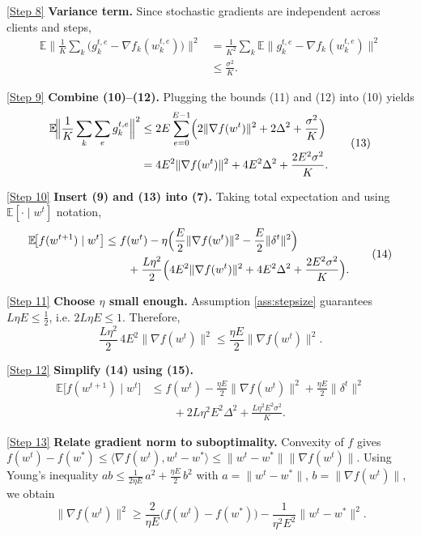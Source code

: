 \documentclass{article}
\newcommand{\E}{\mathbb{E}}
\begin{document}
\medskip
\noindent\underline{[Step 8]} \textbf{Variance term.}  
Since stochastic gradients are independent across clients and steps,
\[
\begin{aligned}
\E\!\Big\|\frac1K\sum_{k}\bigl(g_{k}^{t,e}-\nabla f_k(w_{k}^{t,e})\bigr)\Big\|^{2}
&= \frac1{K^{2}}\sum_{k}\E\!\Big\|g_{k}^{t,e}-\nabla f_k(w_{k}^{t,e})\Big\|^{2}\\
&\le \frac{\sigma^{2}}{K}.
\end{aligned} \tag{12}
\]

\medskip
\noindent\underline{[Step 9]} \textbf{Combine (10)–(12).}  
Plugging the bounds (11) and (12) into (10) yields
\[
\begin{aligned}
\E\!\Big\|\frac1K\sum_{k}\sum_{e} g_{k}^{t,e}\Big\|^{2}
&\le 2E\sum_{e=0}^{E-1}\Bigl(2\|\nabla f(w^{t})\|^{2}+2\Delta^{2}+\frac{\sigma^{2}}{K}\Bigr)\\
&= 4E^{2}\|\nabla f(w^{t})\|^{2}+4E^{2}\Delta^{2}+ \frac{2E^{2}\sigma^{2}}{K}.
\end{aligned} \tag{13}
\]

\medskip
\noindent\underline{[Step 10]} \textbf{Insert (9) and (13) into (7).}  
Taking total expectation and using $\E[\cdot\mid w^{t}]$ notation,
\[
\begin{aligned}
\E\!\bigl[f(w^{t+1})\mid w^{t}\bigr]
&\le f(w^{t})-\eta\Bigl(\frac{E}{2}\|\nabla f(w^{t})\|^{2}-\frac{E}{2}\|\delta^{t}\|^{2}\Bigr)\\
&\qquad+\frac{L\eta^{2}}{2}\Bigl(4E^{2}\|\nabla f(w^{t})\|^{2}+4E^{2}\Delta^{2}+ \frac{2E^{2}\sigma^{2}}{K}\Bigr).
\end{aligned} \tag{14}
\]

\medskip
\noindent\underline{[Step 11]} \textbf{Choose $\eta$ small enough.}  
Assumption \ref{ass:stepsize} guarantees $L\eta E\le \tfrac12$, i.e. $2L\eta E\le1$.  
Therefore,
\[
\frac{L\eta^{2}}{2}\,4E^{2}\|\nabla f(w^{t})\|^{2}
\le \frac{\eta E}{2}\|\nabla f(w^{t})\|^{2}. \tag{15}
\]

\medskip
\noindent\underline{[Step 12]} \textbf{Simplify (14) using (15).}  
\[
\begin{aligned}
\E\!\bigl[f(w^{t+1})\mid w^{t}\bigr]
&\le f(w^{t})-\frac{\eta E}{2}\|\nabla f(w^{t})\|^{2}
   +\frac{\eta E}{2}\|\delta^{t}\|^{2}\\
&\qquad+ 2L\eta^{2}E^{2}\Delta^{2}+ \frac{L\eta^{2}E^{2}\sigma^{2}}{K}.
\end{aligned} \tag{16}
\]

\medskip
\noindent\underline{[Step 13]} \textbf{Relate gradient norm to suboptimality.}  
Convexity of $f$ gives $f(w^{t})-f(w^{*})\le \langle\nabla f(w^{t}),w^{t}-w^{*}\rangle\le \|w^{t}-w^{*}\|\|\nabla f(w^{t})\|$.  
Using Young’s inequality $ab\le \frac{1}{2\eta E}\,a^{2}+\frac{\eta E}{2}\,b^{2}$ with $a=\|w^{t}-w^{*}\|$, $b=\|\nabla f(w^{t})\|$, we obtain
\[
\|\nabla f(w^{t})\|^{2}\ge \frac{2}{\eta E}\bigl(f(w^{t})-f(w^{*})\bigr)-\frac{1}{\eta^{2}E^{2}}\|w^{t}-w^{*}\|^{2}. \tag{17}
\]
\end{document}
